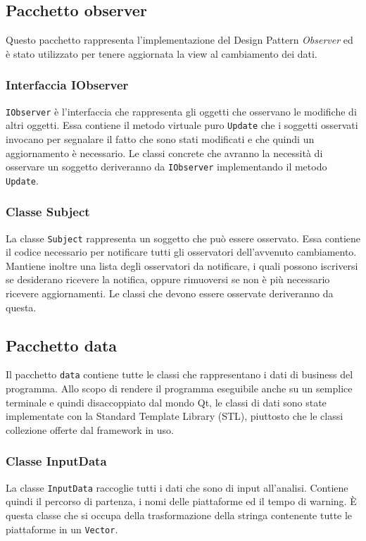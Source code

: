 	\subsection{Pacchetto observer}
		Questo pacchetto rappresenta l'implementazione del Design Pattern \textit{Observer} ed è stato utilizzato per tenere aggiornata la view al cambiamento dei dati.
		
		\subsubsection{Interfaccia IObserver}
		\texttt{IObserver} è l'interfaccia che rappresenta gli oggetti che osservano le modifiche di altri oggetti. Essa contiene il metodo virtuale puro \texttt{Update} che i soggetti osservati invocano per segnalare il fatto che sono stati modificati e che quindi un aggiornamento è necessario. Le classi concrete che avranno la necessità di osservare un soggetto deriveranno da \texttt{IObserver} implementando il metodo \texttt{Update}.
		
		\subsubsection{Classe Subject}
		La classe \texttt{Subject} rappresenta un soggetto che può essere osservato. Essa contiene il codice necessario per notificare tutti gli osservatori dell'avvenuto cambiamento. Mantiene inoltre una lista degli osservatori da notificare, i quali possono iscriversi se desiderano ricevere la notifica, oppure rimuoversi se non è più necessario ricevere aggiornamenti. Le classi che devono essere osservate deriveranno da questa.
	
	\subsection{Pacchetto data}
		Il pacchetto \texttt{data} contiene tutte le classi che rappresentano i dati di business del programma. Allo scopo di rendere il programma eseguibile anche su un semplice terminale e quindi disaccoppiato dal mondo Qt\textsuperscript{\textregistered}, le classi di dati sono state implementate con la Standard Template Library (STL), piuttosto che le classi collezione offerte dal framework in uso.
	
		\subsubsection{Classe InputData}
			La classe \texttt{InputData} raccoglie tutti i dati che sono di input all'analisi. Contiene quindi il percorso di partenza, i nomi delle piattaforme ed il tempo di warning. È questa classe che si occupa della trasformazione della stringa contenente tutte le piattaforme in un \texttt{Vector}.
				

